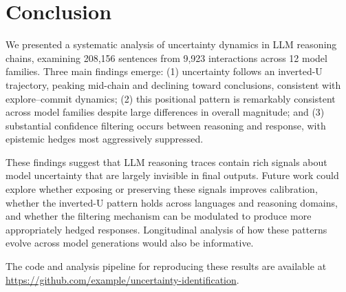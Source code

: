 \section{Conclusion}

We presented a systematic analysis of uncertainty dynamics in LLM reasoning chains, examining 208,156 sentences from 9,923 interactions across 12 model families. Three main findings emerge: (1) uncertainty follows an inverted-U trajectory, peaking mid-chain and declining toward conclusions, consistent with explore--commit dynamics; (2) this positional pattern is remarkably consistent across model families despite large differences in overall magnitude; and (3) substantial confidence filtering occurs between reasoning and response, with epistemic hedges most aggressively suppressed.

These findings suggest that LLM reasoning traces contain rich signals about model uncertainty that are largely invisible in final outputs. Future work could explore whether exposing or preserving these signals improves calibration, whether the inverted-U pattern holds across languages and reasoning domains, and whether the filtering mechanism can be modulated to produce more appropriately hedged responses. Longitudinal analysis of how these patterns evolve across model generations would also be informative.

The code and analysis pipeline for reproducing these results are available at \url{https://github.com/example/uncertainty-identification}.
